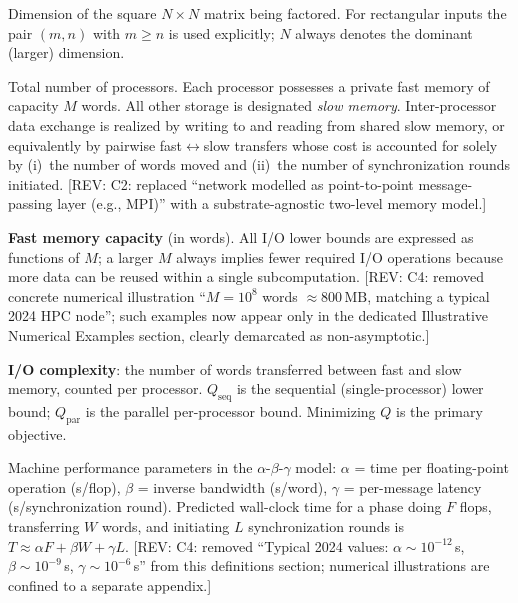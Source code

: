 \documentclass[11pt]{article}
\newcommand{\REV}[1]{\textcolor{blue!60!black}{\small\textsf{[REV: #1]}}}
\begin{document}
\begin{description}[leftmargin=3.5em, labelwidth=3em, labelsep=0.5em,
                    style=nextline, font=\normalfont\itshape]

\item[$N$] Dimension of the square $N \times N$ matrix being factored.
  For rectangular inputs the pair $(m, n)$ with $m \ge n$ is used
  explicitly; $N$ always denotes the dominant (larger) dimension.

\item[$P$] Total number of processors. Each processor possesses a
  private fast memory of capacity $M$ words. All other storage is
  designated \emph{slow memory}. Inter-processor data exchange is
  realized by writing to and reading from shared slow memory, or
  equivalently by pairwise fast$\leftrightarrow$slow transfers whose
  cost is accounted for solely by (i)~the number of words moved and
  (ii)~the number of synchronization rounds initiated.
  \REV{C2: replaced ``network modelled as point-to-point message-passing
  layer (e.g., MPI)'' with a substrate-agnostic two-level memory model.}

\item[$M$] \textbf{Fast memory capacity} (in words). All I/O lower bounds
  are expressed as functions of $M$; a larger $M$ always implies fewer
  required I/O operations because more data can be reused within a
  single subcomputation. \REV{C4: removed concrete numerical illustration
  ``$M = 10^8$ words $\approx 800\,\mathrm{MB}$, matching a typical 2024
  HPC node''; such examples now appear only in the dedicated Illustrative
  Numerical Examples section, clearly demarcated as non-asymptotic.}

\item[$Q$ (or $Q_{\mathrm{par}}$, $Q_{\mathrm{seq}}$)]
  \textbf{I/O complexity}: the number of words transferred between fast
  and slow memory, counted per processor. $Q_{\mathrm{seq}}$ is the
  sequential (single-processor) lower bound; $Q_{\mathrm{par}}$ is the
  parallel per-processor bound. Minimizing $Q$ is the primary objective.

\item[$\alpha,\,\beta,\,\gamma$] Machine performance parameters in the
  $\alpha$-$\beta$-$\gamma$ model: $\alpha$ = time per floating-point
  operation (s/flop), $\beta$ = inverse bandwidth (s/word), $\gamma$ =
  per-message latency (s/synchronization round). Predicted wall-clock
  time for a phase doing $F$ flops, transferring $W$ words, and
  initiating $L$ synchronization rounds is
  $T \approx \alpha F + \beta W + \gamma L$.
  \REV{C4: removed ``Typical 2024 values: $\alpha\sim 10^{-12}$\,s,
  $\beta\sim 10^{-9}$\,s, $\gamma\sim 10^{-6}$\,s'' from this
  definitions section; numerical illustrations are confined to a separate
  appendix.}

\end{description}
\end{document}
